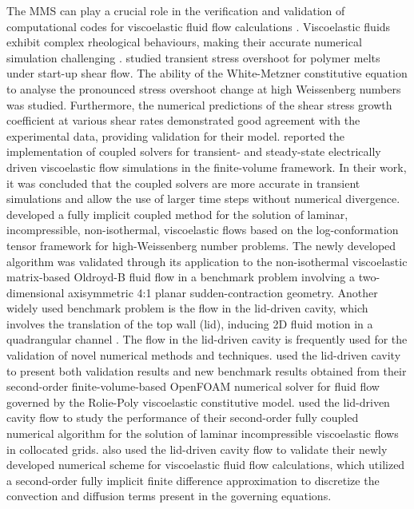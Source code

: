 \documentclass[preprint, 12pt]{elsarticle}
\begin{document}
The MMS can play a crucial role in the verification and validation of computational codes for viscoelastic fluid flow calculations \cite{Garcia2022}. Viscoelastic fluids exhibit complex rheological behaviours, making their accurate numerical simulation challenging \cite{Fernandes2017}. 
\citeauthor{Tseng2021} studied transient stress overshoot for polymer melts under start-up shear flow. The ability of the White-Metzner constitutive equation to analyse the pronounced stress overshoot change at high Weissenberg numbers was studied. Furthermore, the numerical predictions of the shear stress growth coefficient at various shear rates demonstrated good agreement with the experimental data, providing validation for their model. \citet{Pimenta2019} reported the implementation of coupled solvers for transient- and steady-state electrically driven viscoelastic flow simulations in the finite-volume framework. In their work, it was concluded that the coupled solvers are more accurate in transient simulations and allow the use of larger time steps without numerical divergence. \citet{Fernandes2022} developed a fully implicit coupled method for the solution of laminar, incompressible, non-isothermal, viscoelastic flows based on the log-conformation tensor framework for high-Weissenberg number problems. The newly developed algorithm was validated through its application to the non-isothermal viscoelastic matrix-based Oldroyd-B fluid flow in a benchmark problem involving a two-dimensional axisymmetric 4:1 planar sudden-contraction geometry. Another widely used benchmark problem is the flow in the lid-driven cavity, which involves the translation of the top wall (lid), inducing 2D fluid motion in a quadrangular channel \cite{Shankar2000}. The flow in the lid-driven cavity is frequently used for the validation of novel numerical methods and techniques. \citet{Abuga2020} used the lid-driven cavity to present both validation results and new benchmark results obtained from their second-order finite-volume-based OpenFOAM numerical solver for fluid flow governed by the Rolie-Poly viscoelastic constitutive model. \citet{Fernandes2019} used the lid-driven cavity flow to study the performance of their second-order fully coupled numerical algorithm for the solution of laminar incompressible viscoelastic flows in collocated grids. \citet{Tomio2020} also used the lid-driven cavity flow to validate their newly developed numerical scheme for viscoelastic fluid flow calculations, which utilized a second-order fully implicit finite difference approximation to discretize the convection and diffusion terms present in the governing equations.
\end{document}
